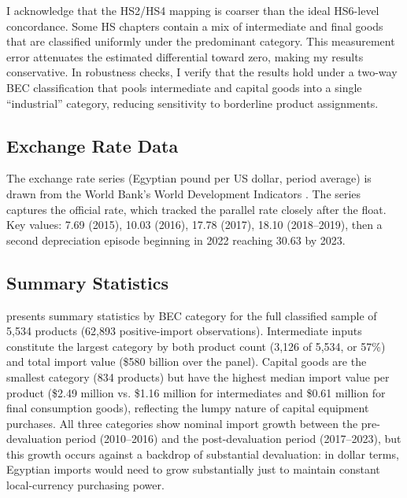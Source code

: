 \documentclass[12pt]{article}
\begin{document}
I acknowledge that the HS2/HS4 mapping is coarser than the ideal HS6-level concordance. Some HS chapters contain a mix of intermediate and final goods that are classified uniformly under the predominant category. This measurement error attenuates the estimated differential toward zero, making my results conservative. In robustness checks, I verify that the results hold under a two-way BEC classification that pools intermediate and capital goods into a single ``industrial'' category, reducing sensitivity to borderline product assignments.

\subsection{Exchange Rate Data}

The exchange rate series (Egyptian pound per US dollar, period average) is drawn from the World Bank's World Development Indicators \citep{worldbank2024wdi}. The series captures the official rate, which tracked the parallel rate closely after the float. Key values: 7.69 (2015), 10.03 (2016), 17.78 (2017), 18.10 (2018--2019), then a second depreciation episode beginning in 2022 reaching 30.63 by 2023.

\subsection{Summary Statistics}

 presents summary statistics by BEC category for the full classified sample of 5,534 products (62,893 positive-import observations). Intermediate inputs constitute the largest category by both product count (3,126 of 5,534, or 57\%) and total import value (\$580 billion over the panel). Capital goods are the smallest category (834 products) but have the highest median import value per product (\$2.49 million vs. \$1.16 million for intermediates and \$0.61 million for final consumption goods), reflecting the lumpy nature of capital equipment purchases. All three categories show nominal import growth between the pre-devaluation period (2010--2016) and the post-devaluation period (2017--2023), but this growth occurs against a backdrop of substantial devaluation: in dollar terms, Egyptian imports would need to grow substantially just to maintain constant local-currency purchasing power.
\end{document}
